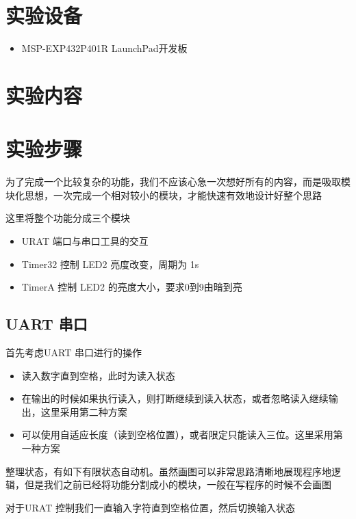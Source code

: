 \documentclass[a4paper,10pt,UTF8]{paper}
\numberwithin{equation}{section}
\numberwithin{figure}{section}
\begin{document}
\section{实验设备}

\begin{itemize}
    \item MSP-EXP432P401R LaunchPad开发板
\end{itemize}

\section{实验内容}

\section{实验步骤}

为了完成一个比较复杂的功能，我们不应该心急一次想好所有的内容，而是吸取模块化思想，一次完成一个相对较小的模块，才能快速有效地设计好整个思路

这里将整个功能分成三个模块

\begin{itemize}
    \item URAT 端口与串口工具的交互
    \item Timer32 控制 LED2 亮度改变，周期为 1s
    \item TimerA 控制 LED2 的亮度大小，要求0到9由暗到亮
\end{itemize}

\subsection{UART 串口}

首先考虑UART 串口进行的操作

\begin{itemize}
    \item 读入数字直到空格，此时为读入状态
    \item 在输出的时候如果执行读入，则打断继续到读入状态，或者忽略读入继续输出，这里采用第二种方案
    \item 可以使用自适应长度（读到空格位置），或者限定只能读入三位。这里采用第一种方案
\end{itemize}

整理状态，有如下有限状态自动机。虽然画图可以非常思路清晰地展现程序地逻辑，但是我们之前已经将功能分割成小的模块，一般在写程序的时候不会画图

对于URAT 控制我们一直输入字符直到空格位置，然后切换输入状态
\end{document}
